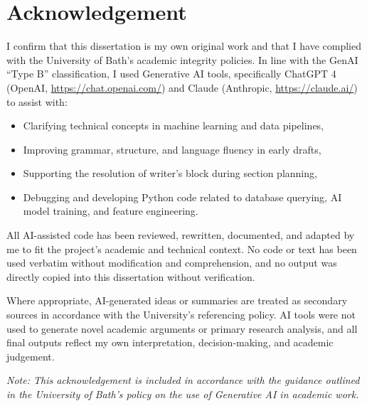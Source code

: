 \chapter*{Acknowledgement}

I confirm that this dissertation is my own original work and that I have complied with the University of Bath's academic integrity policies. 
In line with the GenAI “Type B” classification, I used Generative AI tools, specifically ChatGPT 4 (OpenAI, \url{https://chat.openai.com/}) and Claude (Anthropic, \url{https://claude.ai/}) to assist with:

\begin{itemize}
  \item Clarifying technical concepts in machine learning and data pipelines,
  \item Improving grammar, structure, and language fluency in early drafts,
  \item Supporting the resolution of writer’s block during section planning,
  \item Debugging and developing Python code related to database querying, AI model training, and feature engineering.
\end{itemize}

All AI-assisted code has been reviewed, rewritten, documented, and adapted by me to fit the project’s academic and technical context. 
No code or text has been used verbatim without modification and comprehension, and no output was directly copied into this dissertation without verification.

Where appropriate, AI-generated ideas or summaries are treated as secondary sources in accordance with the University’s referencing policy. 
AI tools were not used to generate novel academic arguments or primary research analysis, and all final outputs reflect my own interpretation, decision-making, and academic judgement.

\vspace{1cm}

\noindent\textit{Note: This acknowledgement is included in accordance with the guidance outlined in the University of Bath's policy on the use of Generative AI in academic work.}
